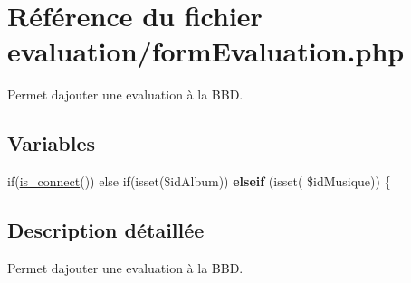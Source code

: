 \hypertarget{formEvaluation_8php}{}\section{Référence du fichier evaluation/form\+Evaluation.php}
\label{formEvaluation_8php}


Permet d\textquotesingle{}ajouter une evaluation à la B\+BD.  


\subsection*{Variables}
\begin{DoxyCompactItemize}
\item 
\mbox{\label{formEvaluation_8php_ad0f5322061402eac643820612b022df5}} 
if(\hyperlink{fonctionCompte_8php_a2fe594e0482307b8729ea37780d6f74b}{is\+\_\+connect}()) else if(isset(\$id\+Album)) {\bfseries elseif} (isset( \$id\+Musique)) \{
\end{DoxyCompactItemize}


\subsection{Description détaillée}
Permet d\textquotesingle{}ajouter une evaluation à la B\+BD. 

